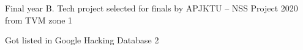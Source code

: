 

\begin{cvhonors}

  \cvhonor
    {Final year B. Tech project selected for finals by APJKTU – NSS Project 2020 from TVM zone} %
    {} %
    {} %
    {1} %

  \cvhonor
    {Got listed in Google Hacking Database} %
    {} %
    {} %
    {2} %

    
\end{cvhonors}
